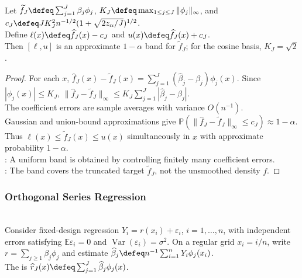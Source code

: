 \begin{theorem} \label{thm:orthogonal-density-confidence-band} \\
Let $\widetilde f_J\defeq\sum_{j=1}^{J}\beta_j\phi_j$, $K_J\defeq\max_{1\leq j\leq J}\|\phi_j\|_\infty$, and $c_J\defeq JK_J^2n^{-1/2}(1+\sqrt{2z_\alpha/J})^{1/2}$.\\
Define $\ell(x)\defeq\widehat f_J(x)-c_J$ and $u(x)\defeq\widehat f_J(x)+c_J$.\\
Then $[\ell,u]$ is an approximate $1-\alpha$ band for $\widetilde f_J$; for the cosine basis, $K_J=\sqrt2$.
\begin{proof} For each $x$, $\widehat f_J(x)-\widetilde f_J(x)=\sum_{j=1}^{J}(\widehat\beta_j-\beta_j)\phi_j(x)$. Since $|\phi_j(x)|\leq K_J$, $\|\widehat f_J-\widetilde f_J\|_\infty\leq K_J\sum_{j=1}^{J}|\widehat\beta_j-\beta_j|$.\\
The coefficient errors are sample averages with variance $O(n^{-1})$.\\
Gaussian and union-bound approximations give $\mathbb{P}(\|\widehat f_J-\widetilde f_J\|_\infty\leq c_J)\approx1-\alpha$.\\
Thus $\ell(x)\leq\widetilde f_J(x)\leq u(x)$ simultaneously in $x$ with approximate probability $1-\alpha$.\\
: A uniform band is obtained by controlling finitely many coefficient errors.\\
: The band covers the truncated target $\widetilde f_J$, not the unsmoothed density $f$.
\end{proof}
\end{theorem}

\subsubsection{Orthogonal Series Regression}

\begin{definition} \label{def:orthogonal-series-regression-estimator} \\
Consider fixed-design regression $Y_i=r(x_i)+\varepsilon_i$, $i=1,\ldots,n$, with independent errors satisfying $\mathbb{E}\varepsilon_i=0$ and $\operatorname{Var}(\varepsilon_i)=\sigma^2$. On a regular grid $x_i=i/n$, write $r=\sum_{j\geq1}\beta_j\phi_j$ and estimate $\widehat\beta_j\defeq n^{-1}\sum_{i=1}^{n}Y_i\phi_j(x_i)$.\\
The  is $\widehat r_J(x)\defeq\sum_{j=1}^{J}\widehat\beta_j\phi_j(x)$.
\end{definition}

